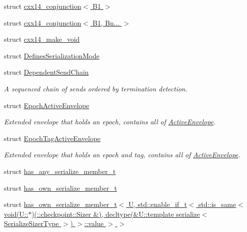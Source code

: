 \begin{DoxyCompactItemize}
struct \hyperlink{structvt_1_1messaging_1_1cxx14__conjunction_3_01_b1_01_4}{cxx14\+\_\+conjunction$<$ B1 $>$}
\item 
struct \hyperlink{structvt_1_1messaging_1_1cxx14__conjunction_3_01_b1_00_01_bn_8_8_8_01_4}{cxx14\+\_\+conjunction$<$ B1, Bn... $>$}
\item 
struct \hyperlink{structvt_1_1messaging_1_1cxx14__make__void}{cxx14\+\_\+make\+\_\+void}
\item 
struct \hyperlink{structvt_1_1messaging_1_1_defines_serialization_mode}{Defines\+Serialization\+Mode}
\item 
struct \hyperlink{classvt_1_1messaging_1_1_dependent_send_chain}{Dependent\+Send\+Chain}
\begin{DoxyCompactList}\small\item\em A sequenced chain of sends ordered by termination detection. \end{DoxyCompactList}\item 
struct \hyperlink{structvt_1_1messaging_1_1_epoch_active_envelope}{Epoch\+Active\+Envelope}
\begin{DoxyCompactList}\small\item\em Extended envelope that holds an epoch, contains all of {\ttfamily \hyperlink{structvt_1_1messaging_1_1_active_envelope}{Active\+Envelope}}. \end{DoxyCompactList}\item 
struct \hyperlink{structvt_1_1messaging_1_1_epoch_tag_active_envelope}{Epoch\+Tag\+Active\+Envelope}
\begin{DoxyCompactList}\small\item\em Extended envelope that holds an epoch and tag, contains all of {\ttfamily \hyperlink{structvt_1_1messaging_1_1_active_envelope}{Active\+Envelope}}. \end{DoxyCompactList}\item 
struct \hyperlink{structvt_1_1messaging_1_1has__any__serialize__member__t}{has\+\_\+any\+\_\+serialize\+\_\+member\+\_\+t}
\item 
struct \hyperlink{structvt_1_1messaging_1_1has__own__serialize__member__t}{has\+\_\+own\+\_\+serialize\+\_\+member\+\_\+t}
\item 
struct \hyperlink{structvt_1_1messaging_1_1has__own__serialize__member__t_3_01_u_00_01std_1_1enable__if__t_3_01std8741339fbc39701010cb527cee7ae844}{has\+\_\+own\+\_\+serialize\+\_\+member\+\_\+t$<$ U, std\+::enable\+\_\+if\+\_\+t$<$ std\+::is\+\_\+same$<$ void(\+U\+::$\ast$)(\+::checkpoint\+::\+Sizer \&), decltype(\&\+U\+::template serialize$<$ Serialize\+Sizer\+Type $>$) $>$\+::value $>$ $>$}

\end{DoxyCompactItemize}
